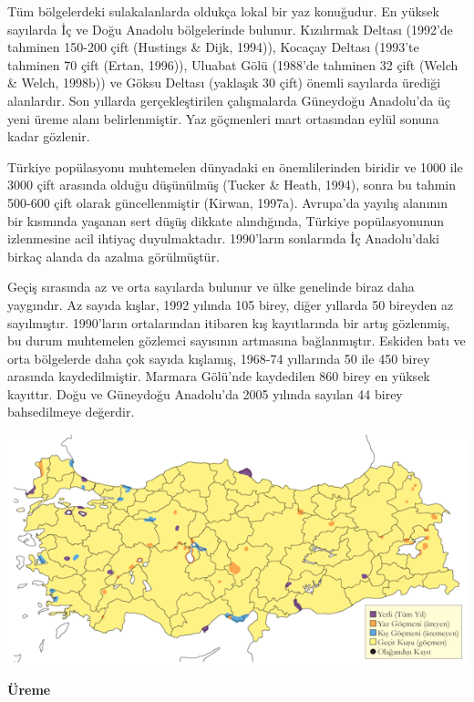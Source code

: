 \documentclass[
  a4paper,
  DIV=11,
  numbers=noendperiod]{scrreprt}
\begin{document}
Tüm bölgelerdeki sulakalanlarda oldukça lokal bir yaz konuğudur. En
yüksek sayılarda İç ve Doğu Anadolu bölgelerinde bulunur. Kızılırmak
Deltası (1992'de tahminen 150-200 çift (Hustings \& Dijk, 1994)),
Kocaçay Deltası (1993'te tahminen 70 çift (Ertan, 1996)), Uluabat Gölü
(1988'de tahminen 32 çift (Welch \& Welch, 1998b)) ve Göksu Deltası
(yaklaşık 30 çift) önemli sayılarda ürediği alanlardır. Son yıllarda
gerçekleştirilen çalışmalarda Güneydoğu Anadolu'da üç yeni üreme alanı
belirlenmiştir. Yaz göçmenleri mart ortasından eylül sonuna kadar
gözlenir.

Türkiye popülasyonu muhtemelen dünyadaki en önemlilerinden biridir ve
1000 ile 3000 çift arasında olduğu düşünülmüş (Tucker \& Heath, 1994),
sonra bu tahmin 500-600 çift olarak güncellenmiştir (Kirwan, 1997a).
Avrupa'da yayılış alanının bir kısmında yaşanan sert düşüş dikkate
alındığında, Türkiye popülasyonunun izlenmesine acil ihtiyaç
duyulmaktadır. 1990'ların sonlarında İç Anadolu'daki birkaç alanda da
azalma görülmüştür.

Geçiş sırasında az ve orta sayılarda bulunur ve ülke genelinde biraz
daha yaygındır. Az sayıda kışlar, 1992 yılında 105 birey, diğer yıllarda
50 bireyden az sayılmıştır. 1990'ların ortalarından itibaren kış
kayıtlarında bir artış gözlenmiş, bu durum muhtemelen gözlemci sayısının
artmasına bağlanmıştır. Eskiden batı ve orta bölgelerde daha çok sayıda
kışlamış, 1968-74 yıllarında 50 ile 450 birey arasında kaydedilmiştir.
Marmara Gölü'nde kaydedilen 860 birey en yüksek kayıttır. Doğu ve
Güneydoğu Anadolu'da 2005 yılında sayılan 44 birey bahsedilmeye
değerdir.

\includegraphics{images/harita_Page_024.png}

\textbf{Üreme}
\end{document}
